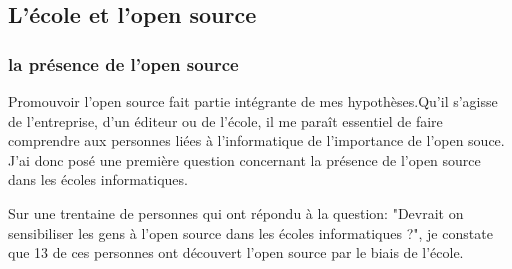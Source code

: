 		\subsection{L'école et l'open source}

			\subsubsection{la présence de l'open source}

				Promouvoir l'open source fait partie intégrante de mes hypothèses.Qu'il s'agisse de l'entreprise, d'un éditeur ou de l'école, il me paraît essentiel de faire comprendre aux personnes liées à l'informatique de l'importance de l'open souce. \\
				J'ai donc posé une première question concernant la présence de l'open source dans les écoles informatiques.

				Sur une trentaine de personnes qui ont répondu à la question: "Devrait on sensibiliser les gens à l'open source dans les écoles informatiques ?", je constate que 13 de ces personnes ont découvert l'open source par le biais de l'école.

